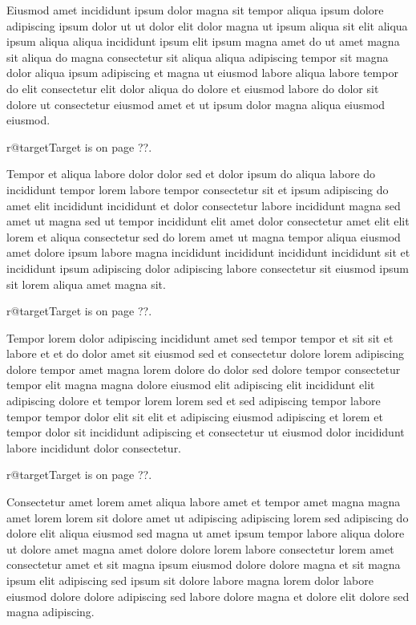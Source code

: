 \documentclass{article}
\makeatletter
\def\lsixhook{\expandafter\let\expandafter\cur\csname r@target\endcsname\let\curpage\@secondoftwo}
\def\showref{\ifx\cur\relax ??\else\expandafter\curpage\cur\fi}
\makeatother
\begin{document}
Eiusmod amet incididunt ipsum dolor magna sit tempor aliqua ipsum dolore adipiscing ipsum dolor ut ut dolor elit dolor magna ut ipsum aliqua sit elit aliqua ipsum aliqua aliqua incididunt ipsum elit ipsum magna amet do ut amet magna sit aliqua do magna consectetur sit aliqua aliqua adipiscing tempor sit magna dolor aliqua ipsum adipiscing et magna ut eiusmod labore aliqua labore tempor do elit consectetur elit dolor aliqua do dolore et eiusmod labore do dolor sit dolore ut consectetur eiusmod amet et ut ipsum dolor magna aliqua eiusmod eiusmod.

\relax\lsixhook Target is on page \showref.

Tempor et aliqua labore dolor dolor sed et dolor ipsum do aliqua labore do incididunt tempor lorem labore tempor consectetur sit et ipsum adipiscing do amet elit incididunt incididunt et dolor consectetur labore incididunt magna sed amet ut magna sed ut tempor incididunt elit amet dolor consectetur amet elit elit lorem et aliqua consectetur sed do lorem amet ut magna tempor aliqua eiusmod amet dolore ipsum labore magna incididunt incididunt incididunt incididunt sit et incididunt ipsum adipiscing dolor adipiscing labore consectetur sit eiusmod ipsum sit lorem aliqua amet magna sit.

\relax\lsixhook Target is on page \showref.

Tempor lorem dolor adipiscing incididunt amet sed tempor tempor et sit sit et labore et et do dolor amet sit eiusmod sed et consectetur dolore lorem adipiscing dolore tempor amet magna lorem dolore do dolor sed dolore tempor consectetur tempor elit magna magna dolore eiusmod elit adipiscing elit incididunt elit adipiscing dolore et tempor lorem lorem sed et sed adipiscing tempor labore tempor tempor dolor elit sit elit et adipiscing eiusmod adipiscing et lorem et tempor dolor sit incididunt adipiscing et consectetur ut eiusmod dolor incididunt labore incididunt dolor consectetur.

\relax\lsixhook Target is on page \showref.

Consectetur amet lorem amet aliqua labore amet et tempor amet magna magna amet lorem lorem sit dolore amet ut adipiscing adipiscing lorem sed adipiscing do dolore elit aliqua eiusmod sed magna ut amet ipsum tempor labore aliqua dolore ut dolore amet magna amet dolore dolore lorem labore consectetur lorem amet consectetur amet et sit magna ipsum eiusmod dolore dolore magna et sit magna ipsum elit adipiscing sed ipsum sit dolore labore magna lorem dolor labore eiusmod dolore dolore adipiscing sed labore dolore magna et dolore elit dolore sed magna adipiscing.
\end{document}
